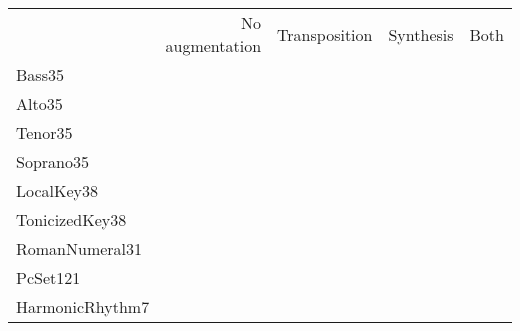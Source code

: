 
\begin{tabular}{lrrrr}
                &  No augmentation & Transposition & Synthesis & Both \\
Bass35          &                  &               &            &     \\
Alto35          &                  &               &            &     \\  
Tenor35         &                  &               &            &     \\
Soprano35       &                  &               &            &     \\
LocalKey38      &                  &               &            &     \\
TonicizedKey38  &                  &               &            &     \\
RomanNumeral31  &                  &               &            &     \\
PcSet121        &                  &               &            &     \\
HarmonicRhythm7 &                  &               &            &     \\
\end{tabular}
